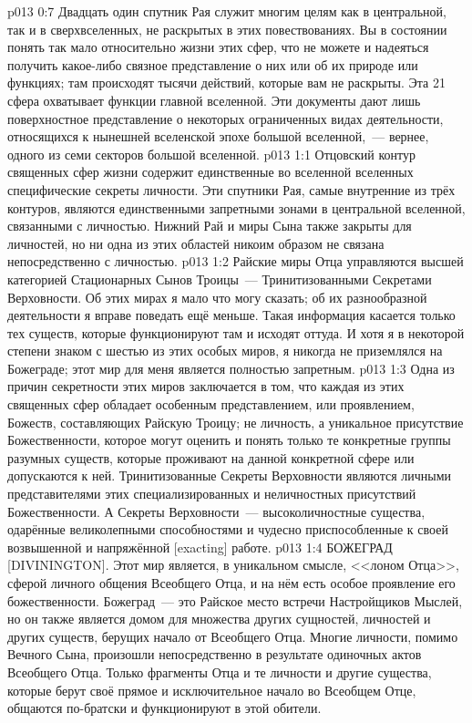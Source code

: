 \vs p013 0:7 Двадцать один спутник Рая служит многим целям как в центральной, так и в сверхвселенных, не раскрытых в этих повествованиях. Вы в состоянии понять так мало относительно жизни этих сфер, что не можете и надеяться получить какое\hyp{}либо связное представление о них или об их природе или функциях; там происходят тысячи действий, которые вам не раскрыты. Эта 21 сфера охватывает  функции главной вселенной. Эти документы дают лишь поверхностное представление о некоторых ограниченных видах деятельности, относящихся к нынешней вселенской эпохе большой вселенной,~--- вернее, одного из семи секторов большой вселенной.
\vs p013 1:1 Отцовский контур священных сфер жизни содержит единственные во вселенной вселенных специфические секреты личности. Эти спутники Рая, самые внутренние из трёх контуров, являются единственными запретными зонами в центральной вселенной, связанными с личностью. Нижний Рай и миры Сына также закрыты для личностей, но ни одна из этих областей никоим образом не связана непосредственно с личностью.
\vs p013 1:2 Райские миры Отца управляются высшей категорией Стационарных Сынов Троицы~--- Тринитизованными Секретами Верховности. Об этих мирах я мало что могу сказать; об их разнообразной деятельности я вправе поведать ещё меньше. Такая информация касается только тех существ, которые функционируют там и исходят оттуда. И хотя я в некоторой степени знаком с шестью из этих особых миров, я никогда не приземлялся на Божеграде; этот мир для меня является полностью запретным.
\vs p013 1:3 Одна из причин секретности этих миров заключается в том, что каждая из этих священных сфер обладает особенным представлением, или проявлением, Божеств, составляющих Райскую Троицу; не личность, а уникальное присутствие Божественности, которое могут оценить и понять только те конкретные группы разумных существ, которые проживают на данной конкретной сфере или допускаются к ней. Тринитизованные Секреты Верховности являются личными представителями этих специализированных и неличностных присутствий Божественности. А Секреты Верховности~--- высоколичностные существа, одарённые великолепными способностями и чудесно приспособленные к своей возвышенной и напряжённой [exacting] работе.
\vs p013 1:4 БОЖЕГРАД [DIVININGTON]. Этот мир является, в уникальном смысле, <<лоном Отца>>, сферой личного общения Всеобщего Отца, и на нём есть особое проявление его божественности. Божеград~--- это Райское место встречи Настройщиков Мыслей, но он также является домом для множества других сущностей, личностей и других существ, берущих начало от Всеобщего Отца. Многие личности, помимо Вечного Сына, произошли непосредственно в результате одиночных актов Всеобщего Отца. Только фрагменты Отца и те личности и другие существа, которые берут своё прямое и исключительное начало во Всеобщем Отце, общаются по\hyp{}братски и функционируют в этой обители.
